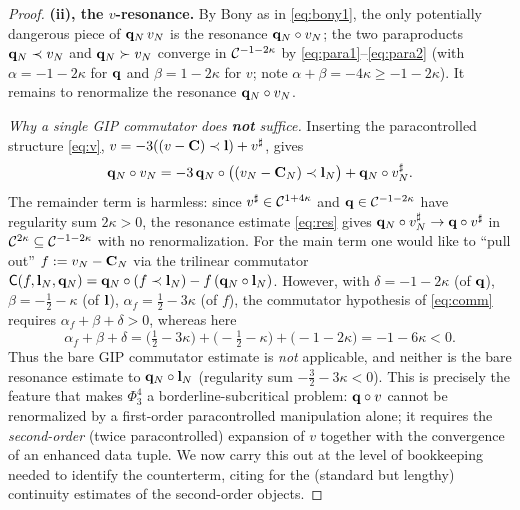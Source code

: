\begin{proof}
\medskip
\textbf{(ii), the $v$-resonance.} By Bony as in \eqref{eq:bony1}, the only
potentially dangerous piece of $\mathbf{q}_N\,v_N$ is the resonance
$\mathbf{q}_N\circ v_N$; the two paraproducts $\mathbf{q}_N\prec v_N$ and
$\mathbf{q}_N\succ v_N$ converge in $\mathcal{C}^{-1-2\kappa}$ by
\eqref{eq:para1}--\eqref{eq:para2} (with $\alpha=-1-2\kappa$ for $\mathbf{q}$ and
$\beta=1-2\kappa$ for $v$; note $\alpha+\beta=-4\kappa\ge -1-2\kappa$). It remains to
renormalize the resonance $\mathbf{q}_N\circ v_N$.

\emph{Why a single GIP commutator does \textbf{not} suffice.} Inserting the
paracontrolled structure \eqref{eq:v}, $v=-3((v-\mathbf{C})\prec\mathbf{l})+v^\sharp$, gives
\begin{equation}\label{eq:vres}
\mathbf{q}_N\circ v_N=-3\,\mathbf{q}_N\circ\bigl((v_N-\mathbf{C}_N)\prec\mathbf{l}_N\bigr)+\mathbf{q}_N\circ v_N^\sharp .
\end{equation}
The remainder term is harmless: since $v^\sharp\in\mathcal{C}^{1+4\kappa}$ and
$\mathbf{q}\in\mathcal{C}^{-1-2\kappa}$ have regularity sum $2\kappa>0$, the resonance estimate
\eqref{eq:res} gives $\mathbf{q}_N\circ v_N^\sharp\to\mathbf{q}\circ v^\sharp$ in
$\mathcal{C}^{2\kappa}\subseteq\mathcal{C}^{-1-2\kappa}$ with no renormalization. For the main term
one would like to ``pull out'' $f:=v_N-\mathbf{C}_N$ via the trilinear commutator
$\mathsf C(f,\mathbf{l}_N,\mathbf{q}_N)=\mathbf{q}_N\circ(f\prec\mathbf{l}_N)-f\,(\mathbf{q}_N\circ\mathbf{l}_N)$.
However, with $\delta=-1-2\kappa$ (of $\mathbf{q}$), $\beta=-\tfrac12-\kappa$ (of $\mathbf{l}$),
$\alpha_f=\tfrac12-3\kappa$ (of $f$), the commutator hypothesis of \eqref{eq:comm}
requires $\alpha_f+\beta+\delta>0$, whereas here
\[
\alpha_f+\beta+\delta=\bigl(\tfrac12-3\kappa\bigr)+\bigl(-\tfrac12-\kappa\bigr)+\bigl(-1-2\kappa\bigr)=-1-6\kappa<0 .
\]
Thus the bare GIP commutator estimate is \emph{not} applicable, and neither is the bare
resonance estimate to $\mathbf{q}_N\circ\mathbf{l}_N$ (regularity sum $-\tfrac32-3\kappa<0$).
This is precisely the feature that makes $\Phi^4_3$ a borderline-subcritical problem:
$\mathbf{q}\circ v$ cannot be renormalized by a first-order paracontrolled manipulation
alone; it requires the \emph{second-order} (twice paracontrolled) expansion of $v$
together with the convergence of an enhanced data tuple. We now carry this out at the
level of bookkeeping needed to identify the counterterm, citing \cite{CC18,GIP15,EW24}
for the (standard but lengthy) continuity estimates of the second-order objects.


\end{proof}
